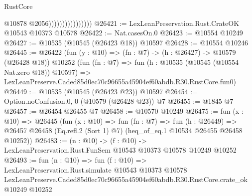 \begin{lexlean}{RustCore}
\begin{coremodule}
                                    @10878
                                    @2056))))))))))))))))
@26421 := LexLeanPreservation.Rust.CrateOK @10543 @10373 @10578
@26422 := Nat.casesOn.{0}
@26423 := @10554 @10249
@26427 := @10535 (@10545 (@26423 @18)) @10597
@26428 := @10554 @10246
@26445 := @26422
    (fun (y : @10) => (fn : @7) -> (h : @26427) -> @10579 (@26428 @18))
    @10252
    (fun (fn : @7) =>
    fun (h : @10535 (@10545 (@10554 Nat.zero @18)) @10597) =>
    LexLeanPreserve.Caded85d0ec70c96655a45904ef60abdb.R30.RustCore.fun0)
@26449 := @10535 (@10545 (@26423 @23)) @10597
@26454 := Option.noConfusion.{0, 0} (@10579 (@26428 @23)) @7
@26455 := @1845 @7
@26457 := @26454 @26455 @7
@26458 := @10570 @10249
@26475 := fun (x : @10) =>
  @26445
    (fun (x : @10) =>
    fun (fn : @7) =>
    fun (h : @26449) =>
    @26457 @26458 (Eq.refl.{2} (Sort 1) @7) (heq_of_eq.{1} @10534 @26455 @26458 @10252))
@26483 := (n : @10) ->
  (f : @10) -> LexLeanPreservation.Rust.FunSem @10543 @10373 @10578 @10249 @10252
@26493 := fun (n : @10) =>
  fun (f : @10) =>
  LexLeanPreservation.Rust.simulate
    @10543
    @10373
    @10578
    LexLeanPreserve.Caded85d0ec70c96655a45904ef60abdb.R30.RustCore.crate_ok
    @10249
    @10252
\end{coremodule}
\end{lexlean}
